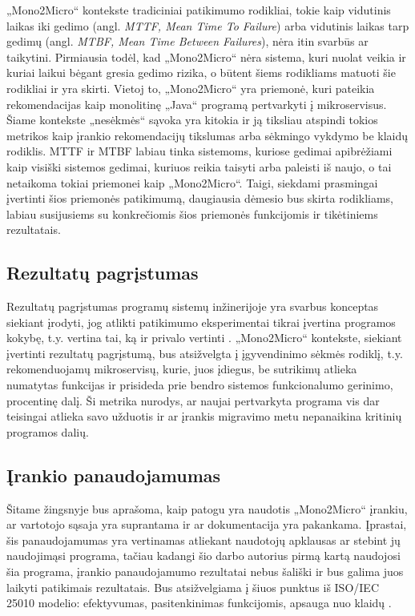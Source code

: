 \documentclass{VUMIFPSbakalaurinis}
\begin{document}
„Mono2Micro“ kontekste tradiciniai patikimumo rodikliai, tokie kaip vidutinis laikas iki gedimo (angl. \emph{MTTF, Mean Time To Failure}) arba vidutinis laikas tarp gedimų (angl. \emph{MTBF, Mean Time Between Failures}), nėra itin svarbūs ar taikytini. Pirmiausia todėl, kad „Mono2Micro“ nėra sistema, kuri nuolat veikia ir kuriai laikui bėgant gresia gedimo rizika, o būtent šiems rodikliams matuoti šie rodikliai ir yra skirti. Vietoj to, „Mono2Micro“ yra priemonė, kuri pateikia rekomendacijas kaip monolitinę „Java“ programą pertvarkyti į mikroservisus. Šiame kontekste „nesėkmės“ sąvoka yra kitokia ir ją tiksliau atspindi tokios metrikos kaip įrankio rekomendacijų tikslumas arba sėkmingo vykdymo be klaidų rodiklis. MTTF ir MTBF labiau tinka sistemoms, kuriose gedimai apibrėžiami kaip visiški sistemos gedimai, kuriuos reikia taisyti arba paleisti iš naujo, o tai netaikoma tokiai priemonei kaip „Mono2Micro“. Taigi, siekdami prasmingai įvertinti šios priemonės patikimumą, daugiausia dėmesio bus skirta rodikliams, labiau susijusiems su konkrečiomis šios priemonės funkcijomis ir tikėtiniems rezultatais.

\subsection{Rezultatų pagrįstumas}
Rezultatų pagrįstumas programų sistemų inžinerijoje yra svarbus konceptas siekiant įrodyti, jog atlikti patikimumo eksperimentai tikrai įvertina programos kokybę, t.y. vertina tai, ką ir privalo vertinti \cite{LMPV}. „Mono2Micro“ kontekste, siekiant įvertinti rezultatų pagrįstumą, bus atsižvelgta į įgyvendinimo sėkmės rodiklį, t.y. rekomenduojamų mikroservisų, kurie, juos įdiegus, be sutrikimų atlieka numatytas funkcijas ir prisideda prie bendro sistemos funkcionalumo gerinimo, procentinę dalį. Ši metrika nurodys, ar naujai pertvarkyta programa vis dar teisingai atlieka savo užduotis ir ar įrankis migravimo metu nepanaikina kritinių programos dalių.

\subsection{Įrankio panaudojamumas}
Šitame žingsnyje bus aprašoma, kaip patogu yra naudotis „Mono2Micro“ įrankiu, ar vartotojo sąsaja yra suprantama ir ar dokumentacija yra pakankama. Įprastai, šis panaudojamumas yra vertinamas atliekant naudotojų apklausas ar stebint jų naudojimąsi programa, tačiau kadangi šio darbo autorius pirmą kartą naudojosi šia programa, įrankio panaudojamumo rezultatai nebus šališki ir bus galima juos laikyti patikimais rezultatais. Bus atsižvelgiama į šiuos punktus iš ISO/IEC 25010 modelio: efektyvumas, pasitenkinimas funkcijomis, apsauga nuo klaidų \cite{iso}.
\end{document}
